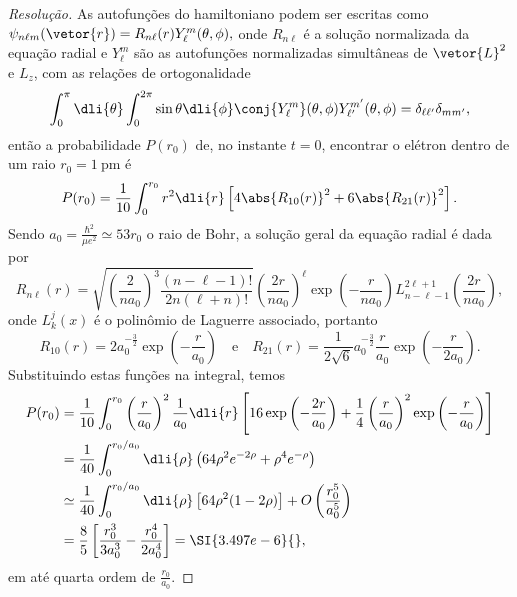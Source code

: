 \begin{proof}[Resolução]
    As autofunções do hamiltoniano podem ser escritas como \(\psi_{n \ell m}(\vetor{r}) = R_{n \ell}(r) Y_{\ell}^m(\theta,\phi),\) onde \(R_{n \ell}\) é a solução normalizada da equação radial e \(Y_\ell^m\) são as autofunções normalizadas simultâneas de \(\vetor{L}^2\) e \(L_z\), com as relações de ortogonalidade
    \begin{equation*}
        \int_0^\pi \dli{\theta}\int_0^{2\pi}\sin\theta\dli{\phi} \conj{Y_{\ell}^m}(\theta,\phi)Y_{\ell'}^{m'}(\theta,\phi) = \delta_{\ell \ell'} \delta_{m m'},
    \end{equation*}
    então a probabilidade \(P(r_0)\) de, no instante \(t=0\), encontrar o elétron dentro de um raio \(r_0 = \SI{1}{\pico\meter}\) é
    \begin{equation*}
        P(r_0)=\frac{1}{10} \int_0^{r_0} r^2 \dli{r}  \left[4\abs{R_{10}(r)}^2 + 6\abs{R_{21}(r)}^2\right].
    \end{equation*}
    Sendo \(a_0 = \frac{\hbar^2}{\mu e^2}\simeq 53 r_0\) o raio de Bohr, a solução geral da equação radial é dada por
    \begin{equation*}
        R_{n\ell}(r) = \sqrt{\left(\frac{2}{n a_0 }\right)^3\frac{(n - \ell -1)!}{2n(\ell + n)!}}  \left(\frac{2r}{n a_0}\right)^\ell \exp\left(-\frac{r}{na_0}\right) L^{2\ell + 1}_{n - \ell - 1}\left(\frac{2r}{n a_0}\right),
    \end{equation*}
    onde \(L_k^j(x)\) é o polinômio de Laguerre associado, portanto
    \begin{equation*}
        R_{10}(r) = 2a_0^{-\frac32} \exp\left(-\frac{r}{a_0}\right)
        \quad\text{e}\quad
        R_{21}(r) = \frac{1}{2\sqrt{6}}a_0^{-\frac32} \frac{r}{a_0} \exp\left(-\frac{r}{2a_0}\right).
    \end{equation*}
    Substituindo estas funções na integral, temos
    \begin{align*}
        P(r_0) &= \frac{1}{10} \int_0^{r_0} \left(\frac{r}{a_0}\right)^2 \frac{1}{a_0} \dli{r} \left[16 \exp\left(-\frac{2r}{a_0}\right) + \frac14 \left(\frac{r}{a_0}\right)^2\exp\left(-\frac{r}{a_0}\right)\right]\\
               &= \frac{1}{40} \int_0^{r_0/a_0} \dli{\rho} \left(64 \rho^2 e^{-2\rho} + \rho^4 e^{-\rho}\right)\\
               &\simeq \frac{1}{40} \int_0^{r_0/a_0} \dli{\rho} \left[64 \rho^2(1 - 2\rho)\right] + O\left(\frac{r_0^5}{a_0^5}\right)\\
               &= \frac{8}{5}\left[\frac{r_0^3}{3a_0^3} - \frac{r_0^4}{2a_0^4}\right] = \SI{3.497e-6}{},
    \end{align*}
    em até quarta ordem de \(\frac{r_0}{a_0}\).


\end{proof}
